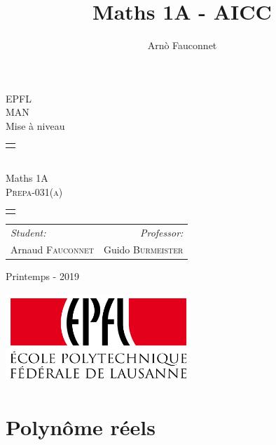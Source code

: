 \documentclass[
    11pt,
    a4paper,
    oneside,
    headinlcude, footinclude,
    twoside,
]{report}
\title{Maths 1A - AICC}
\author{Arnò Fauconnet}
\begin{document}
\begin{titlepage}
   \begin{center}
       \vspace*{\fill}

       {\Huge EPFL}\\ 
       \vfill
       {\huge MAN}\\ [1em]
       {\Large Mise à niveau}\\
        \vfill
        \begin{tabularx}{\textwidth}{X}
            \Xhline{3\arrayrulewidth}\\
        \end{tabularx}\\ [2em]
        {\Huge Maths 1A} \\ [1em]
        \textsc{\huge Prepa-031(a)} \\ [2em]
       \begin{tabularx}{\textwidth}{X}
            \Xhline{3\arrayrulewidth}\\
        \end{tabularx}
        \vspace{.7cm}
        {\large
        \begin{tabularx}{.9\textwidth}{Xr}
            \textit{Student:} & \textit{Professor:}\\
            Arnaud \textsc{Fauconnet} & Guido \textsc{Burmeister}
        \end{tabularx}}
        \vfill
        {\Large Printemps - 2019}

        \vfill
        \includegraphics[width=7cm]{epfl-logo}

       \vfill
   \end{center} 
\end{titlepage} 
\setcounter{chapter}{2}
\chapter{Polynôme réels}
\label{cha:polynome_reels}
\end{document}
